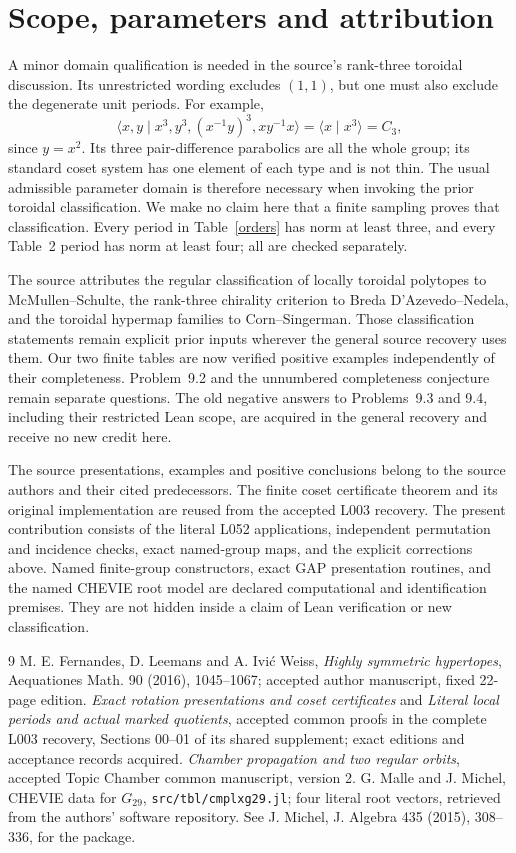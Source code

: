 \documentclass[11pt,a4paper]{article}
\newcommand{\gen}[1]{\langle #1\rangle}\newcommand{\Aut}{\operatorname{Aut}}
\begin{document}
\section{Scope, parameters and attribution}
A minor domain qualification is needed in the source's rank-three
toroidal discussion. Its unrestricted wording excludes $(1,1)$, but
one must also exclude the degenerate unit periods. For example,
\[
 \gen{x,y\mid x^3,y^3,(x^{-1}y)^3,xy^{-1}x}
 =\gen{x\mid x^3}=C_3,
\]
since $y=x^2$. Its three pair-difference parabolics are all the whole
group; its standard coset system has one element of each type and is
not thin. The usual admissible parameter domain is therefore necessary
when invoking the prior toroidal classification. We make no claim here
that a finite sampling proves that classification. Every period in
Table~\ref{orders} has norm at least three, and every Table~2 period has
norm at least four; all are checked separately.

The source attributes the regular classification of locally toroidal
polytopes to McMullen--Schulte, the rank-three chirality criterion to
Breda D'Azevedo--Nedela, and the toroidal hypermap families to
Corn--Singerman. Those classification statements remain explicit prior
inputs wherever the general source recovery uses them. Our two finite
tables are now verified positive examples independently of their
completeness. Problem~9.2 and the unnumbered completeness conjecture
remain separate questions. The old negative answers to Problems~9.3
and 9.4, including their restricted Lean scope, are acquired in the
general recovery and receive no new credit here.

The source presentations, examples and positive conclusions belong to
the source authors and their cited predecessors. The finite coset
certificate theorem and its original implementation are reused from the
accepted L003 recovery. The present contribution consists of the literal
L052 applications, independent permutation and incidence checks, exact
named-group maps, and the explicit corrections above. Named finite-group
constructors, exact GAP presentation routines, and the named CHEVIE root
model are declared computational and identification premises. They are
not hidden inside a claim of Lean verification or new classification.

\begin{thebibliography}{9}\small
{} M. E. Fernandes, D. Leemans and A. Ivi\'c Weiss,
\emph{Highly symmetric hypertopes}, Aequationes Math. 90 (2016),
1045--1067; accepted author manuscript, fixed 22-page edition.
 \emph{Exact rotation presentations and coset certificates}
and \emph{Literal local periods and actual marked quotients}, accepted
common proofs in the complete L003 recovery, Sections 00--01 of its
shared supplement; exact editions and acceptance records acquired.
 \emph{Chamber propagation and two regular orbits},
accepted Topic Chamber common manuscript, version 2.
 G. Malle and J. Michel, CHEVIE data for $G_{29}$,
\texttt{src/tbl/cmplxg29.jl}; four literal root vectors, retrieved from
the authors' software repository. See J. Michel, J. Algebra 435 (2015),
308--336, for the package.
\end{thebibliography}
\end{document}
